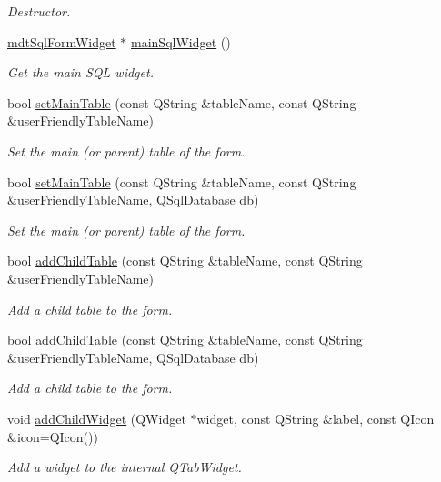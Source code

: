 \begin{DoxyCompactItemize}
\begin{DoxyCompactList}\small\item\em Destructor. \end{DoxyCompactList}\item 
\hyperlink{classmdt_sql_form_widget}{mdtSqlFormWidget} $\ast$ \hyperlink{classmdt_sql_form_a857fc9370e2054408ae8b42e8deedbf5}{mainSqlWidget} ()
\begin{DoxyCompactList}\small\item\em Get the main SQL widget. \end{DoxyCompactList}\item 
bool \hyperlink{classmdt_sql_form_ab03dd80e9de62362dd77161ef6bd6fc2}{setMainTable} (const QString \&tableName, const QString \&userFriendlyTableName)
\begin{DoxyCompactList}\small\item\em Set the main (or parent) table of the form. \end{DoxyCompactList}\item 
bool \hyperlink{classmdt_sql_form_ac2de4ee6f27d7411c2404771585204ae}{setMainTable} (const QString \&tableName, const QString \&userFriendlyTableName, QSqlDatabase db)
\begin{DoxyCompactList}\small\item\em Set the main (or parent) table of the form. \end{DoxyCompactList}\item 
bool \hyperlink{classmdt_sql_form_a3504a54f26777ed38efce5cc151a1dbf}{addChildTable} (const QString \&tableName, const QString \&userFriendlyTableName)
\begin{DoxyCompactList}\small\item\em Add a child table to the form. \end{DoxyCompactList}\item 
bool \hyperlink{classmdt_sql_form_a2a3af0bab78caee638b89aecdc1a2f62}{addChildTable} (const QString \&tableName, const QString \&userFriendlyTableName, QSqlDatabase db)
\begin{DoxyCompactList}\small\item\em Add a child table to the form. \end{DoxyCompactList}\item 
void \hyperlink{classmdt_sql_form_a86174e002c2dd5496ab74a7eb67c614c}{addChildWidget} (QWidget $\ast$widget, const QString \&label, const QIcon \&icon=QIcon())
\begin{DoxyCompactList}\small\item\em Add a widget to the internal QTabWidget. \end{DoxyCompactList}\item 

\end{DoxyCompactItemize}
